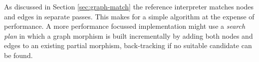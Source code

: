 As discussed in Section \ref{sec:graph-match} the reference interpreter matches nodes and edges in separate passes. This makes for a simple algorithm at the expense of performance. A more performance focussed implementation might use a \textit{search plan}\cite{Zundorf96, Dorr95b} in which a graph morphism is built incrementally by adding both nodes and edges to an existing partial morphism, back-tracking if no suitable candidate can be found.













